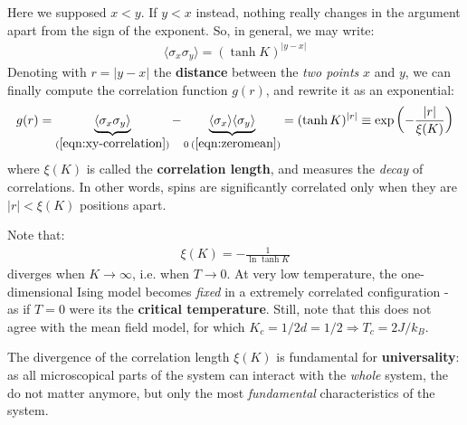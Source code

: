 \documentclass[../../main.tex]{subfiles}
\begin{document}
Here we supposed $x < y$. If $y < x$ instead, nothing really changes in the argument apart from the sign of the exponent. So, in general, we may write:
\begin{align}\label{eqn:xy-correlation}
    \langle \sigma_x \sigma_y \rangle = (\tanh K)^{|y-x|}
\end{align}
Denoting with $r = |y-x|$ the \textbf{distance} between the \textit{two points} $x$ and $y$, we can finally compute the correlation function $g(r)$, and rewrite it as an exponential:
\begin{align}\label{eqn:2point-exp-behaviour}
    g(r) = \underbrace{\langle \sigma_x \sigma_y \rangle}_{(\ref{eqn:xy-correlation})}  - \underbrace{\langle \sigma_x \rangle \langle \sigma_y \rangle}_{0\>(\ref{eqn:zeromean})} = (\tanh K)^{|r|} \equiv \exp\left(-\frac{|r|}{\xi(K)} \right)
\end{align}
where $\xi(K)$ is called the \textbf{correlation length}, and measures the \textit{decay} of correlations. In other words, spins are significantly correlated only when they are $|r| < \xi(K)$ positions apart. 

\medskip

Note that:
\begin{align*}
    \xi(K) = - \frac{1}{\ln \tanh K}  
\end{align*}
diverges when $K \to \infty$, i.e. when $T \to 0$. At very low temperature, the one-dimensional Ising model becomes \textit{fixed} in a extremely correlated configuration - as if $T=0$ were its the \textbf{critical temperature}. Still, note that this does not agree with the mean field model, for which $K_c = 1/2d = 1/2 \Rightarrow T_c = 2 J /k_B$. 

\medskip

The divergence of the correlation length $\xi(K)$ is fundamental for \textbf{universality}: as all microscopical parts of the system can interact with the \textit{whole} system, the  do not matter anymore, but only the most \textit{fundamental} characteristics of the system.
\end{document}
